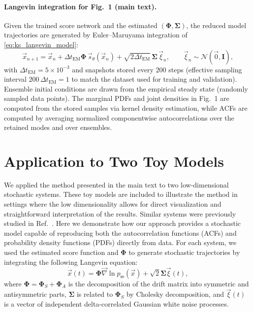 \documentclass[%
  prl,
  reprint,
  amsmath,
  amssymb,
  aps
]{revtex4-2}
\newcommand{\vvec}[1]{\vec{#1}}
\begin{document}
\paragraph{Langevin integration for Fig.~1 (main text).}
Given the trained score network and the estimated $(\bm{\Phi},\bm{\Sigma})$, the reduced model trajectories are generated by Euler--Maruyama integration of \eqref{eq:ks_langevin_model}:
\begin{equation}
\vvec{x}_{n+1}=\vvec{x}_n + \Delta t_{\mathrm{EM}}\bm{\Phi}\,\vvec{s}_{\theta}(\vvec{x}_n)
 + \sqrt{2\Delta t_{\mathrm{EM}}}\,\bm{\Sigma}\,\vvec{\xi}_n,
\qquad
\vvec{\xi}_n\sim\mathcal{N}(\vvec{0},\bm{I}),
\end{equation}
with $\Delta t_{\mathrm{EM}}=5\times 10^{-3}$ and snapshots stored every $200$ steps (effective sampling interval $200\,\Delta t_{\mathrm{EM}}=1$ to match the dataset used for training and validation). Ensemble initial conditions are drawn from the empirical steady state (randomly sampled data points). The marginal PDFs and joint densities in Fig.~1 are computed from the stored samples via kernel density estimation, while ACFs are computed by averaging normalized componentwise autocorrelations over the retained modes and over ensembles.


\section{Application to Two Toy Models}
\label{appendix:toy_models}

We applied the method presented in the main text to two low-dimensional stochastic systems. These toy models are included to illustrate the method in settings where the low dimensionality allows for direct visualization and straightforward interpretation of the results. Similar systems were previously studied in Ref.~\cite{giorgini2025kgmm}. Here we demonstrate how our approach provides a stochastic model capable of reproducing both the autocorrelation functions (ACFs) and probability density functions (PDFs) directly from data. For each system, we used the estimated score function and $\bm{\Phi}$ to generate stochastic trajectories by integrating the following Langevin equation:
\begin{equation}
    \dot{\vvec{x}}(t) = \bm{\Phi} \vvec{\nabla} \ln p_{\mathrm{ss}}(\vvec{x}) + \sqrt{2}\bm{\Sigma} \vvec{\xi}(t),
\end{equation}
where $\bm{\Phi} = \bm{\Phi}_S + \bm{\Phi}_A$ is the decomposition of the drift matrix into symmetric and antisymmetric parts, $\bm{\Sigma}$ is related to $\bm{\Phi}_S$ by Cholesky decomposition, and $\vvec{\xi}(t)$ is a vector of independent delta-correlated Gaussian white noise processes.
\end{document}
